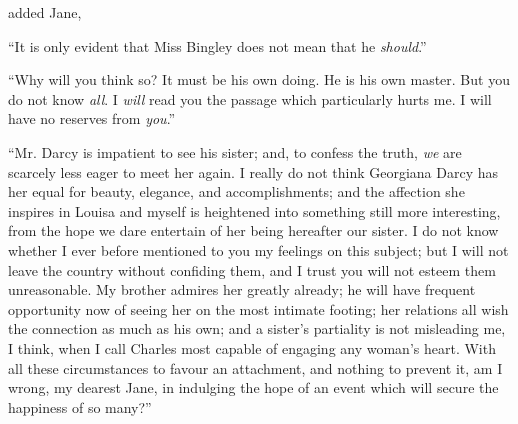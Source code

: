 

 added Jane, 

“It is only evident that Miss Bingley does not mean that he {\em should}.”

“Why will you think so? It must be his own doing. He is his own master. But you do not know {\em all}. I {\em will} read you the passage which particularly hurts me. I will have no reserves from {\em you}.”

“Mr. Darcy is impatient to see his sister; and, to confess the truth, {\em we} are scarcely less eager to meet her again. I really do not think Georgiana Darcy has her equal for beauty, elegance, and accomplishments; and the affection she inspires in Louisa and myself is heightened into something still more interesting, from the hope we dare entertain of her being hereafter our sister. I do not know whether I ever before mentioned to you my feelings on this subject; but I will not leave the country without confiding them, and I trust you will not esteem them unreasonable. My brother admires her greatly already; he will have frequent opportunity now of seeing her on the most intimate footing; her relations all wish the connection as much as his own; and a sister's partiality is not misleading me, I think, when I call Charles most capable of engaging any woman's heart. With all these circumstances to favour an attachment, and nothing to prevent it, am I wrong, my dearest Jane, in indulging the hope of an event which will secure the happiness of so many?”

